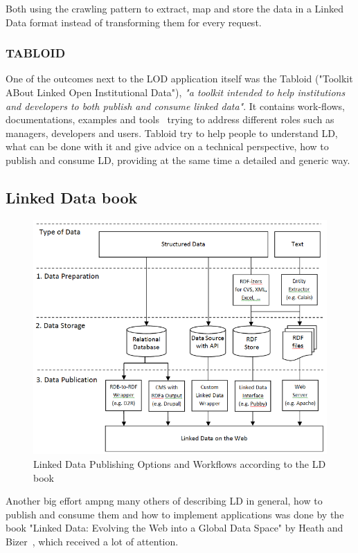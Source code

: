 Both using the crawling pattern to extract, map and store the data in a Linked Data format instead of transforming them for every request.

\subsubsection{TABLOID}
One of the outcomes next to the LOD application itself was the Tabloid ("Toolkit ABout Linked Open Institutional Data"), \emph{"a toolkit intended to help institutions and developers to both publish and consume linked data"}. It contains work-flows, documentations, examples and tools~\cite{lucero:tabloid} trying to address different roles such as managers, developers and users. Tabloid try to help people to understand LD, what can be done with it and give advice on a technical perspective, how to publish and consume LD, providing at the same time a detailed and generic way.

\subsection{Linked Data book}

\begin{figure}[htbp]
	\centering
\includegraphics[width=\textwidth]{img/ld_architecture.png}
	\caption{Linked Data Publishing Options and Workflows according to the LD book}
	\label{ld_architecture}
\end{figure}

Another big effort ampng many others of describing LD in general, how to publish and consume them and how to implement applications was done by the book "Linked Data: Evolving the Web into a Global Data Space" by Heath and Bizer~\cite{heath2011linked}, which received a lot of attention.

